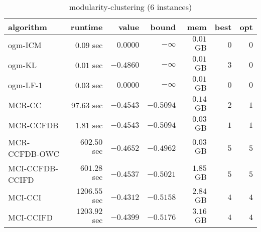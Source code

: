 \begin{table}[H]
\tiny
\centering
\caption{modularity-clustering (6 instances)}
\label{tab:smalltable-modularity-clustering}
\begin{tabular}{lrrrrrr}
\toprule
           algorithm &       runtime     &         value &         bound &           mem &     best &      opt   \\ \midrule 
             ogm-ICM & $         0.09$ sec & $       0.0000$ & $-\infty$ & $         0.01$ GB & $       0$ & $       0$ \\ 
              ogm-KL & $         0.01$ sec & $      -0.4860$ & $-\infty$ & $         0.01$ GB & $       3$ & $       0$ \\ 
            ogm-LF-1 & $         0.03$ sec & $       0.0000$ & $-\infty$ & $         0.01$ GB & $       0$ & $       0$ \\ 
\cmidrule{1-1} 
              MCR-CC & $        97.63$ sec & $      -0.4543$ & $      -0.5094$ & $         0.14$ GB & $       2$ & $       1$ \\ 
           MCR-CCFDB & $         1.81$ sec & $      -0.4543$ & $      -0.5094$ & $         0.03$ GB & $       1$ & $       1$ \\ 
       MCR-CCFDB-OWC & $       602.50$ sec & $      -0.4652$ & $      -0.4962$ & $         0.03$ GB & $       5$ & $       5$ \\ 
\cmidrule{1-1} 
     MCI-CCFDB-CCIFD & $       601.28$ sec & $      -0.4537$ & $      -0.5021$ & $         1.85$ GB & $       5$ & $       5$ \\ 
             MCI-CCI & $      1206.55$ sec & $      -0.4312$ & $      -0.5158$ & $         2.84$ GB & $       4$ & $       4$ \\ 
           MCI-CCIFD & $      1203.92$ sec & $      -0.4399$ & $      -0.5176$ & $         3.16$ GB & $       4$ & $       4$ \\ 
\bottomrule
\end{tabular}
\end{table}